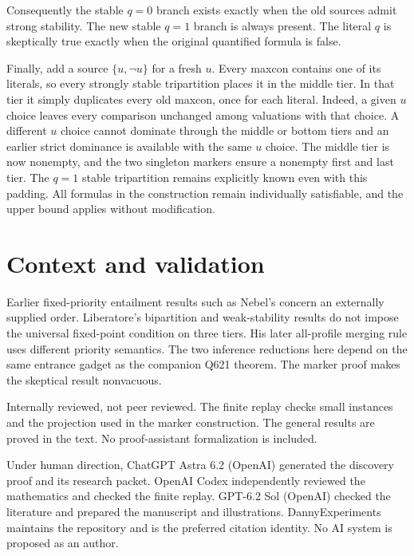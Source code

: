 \documentclass[11pt,a4paper]{amsart}
\begin{document}
Consequently the stable \(q=0\) branch exists exactly when the
old sources admit strong stability. The new stable \(q=1\)
branch is always present. The literal \(q\) is skeptically true
exactly when the original quantified formula is false.

Finally, add a source \(\{u,\neg u\}\) for a fresh \(u\).
Every maxcon contains one of its literals, so every strongly
stable tripartition places it in the middle tier. In that tier
it simply duplicates every old maxcon, once for each literal.
Indeed, a given \(u\) choice leaves every comparison unchanged
among valuations with that choice. A different \(u\) choice
cannot dominate through the middle or bottom tiers and an
earlier strict dominance is available with the same \(u\)
choice. The middle tier is now nonempty, and the two singleton
markers ensure a nonempty first and last tier. The \(q=1\)
stable tripartition remains explicitly known even with this
padding. All formulas in the construction remain individually
satisfiable, and the upper bound applies without modification.

\section{Context and validation}

Earlier fixed-priority entailment results such as Nebel's
\cite{nebel} concern an externally supplied order. Liberatore's
bipartition and weak-stability results do not impose the
universal fixed-point condition on three tiers. His later
all-profile merging rule \cite{absence} uses different
priority semantics. The two inference reductions here depend
on the same entrance gadget as the companion Q621 theorem.
The marker proof makes the skeptical result nonvacuous.

Internally reviewed, not peer reviewed. The finite replay checks
small instances and the projection used in the marker construction.
The general results are proved in the text. No proof-assistant
formalization is included.

Under human direction, ChatGPT Astra 6.2 (OpenAI) generated the
discovery proof and its research packet. OpenAI Codex independently
reviewed the mathematics and checked the finite replay.
GPT-6.2 Sol (OpenAI) checked the literature and prepared the
manuscript and illustrations. DannyExperiments maintains the
repository and is the preferred citation identity. No AI system
is proposed as an author.
\end{document}
